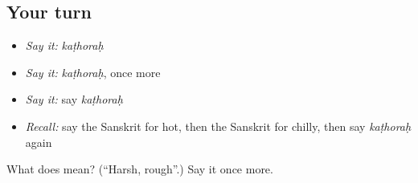 \subsection*{Your turn}
\begin{itemize}
\raggedright
  \item \emph{Say it:} \emph{kaṭhoraḥ}
  \item \emph{Say it:} \emph{kaṭhoraḥ}, once more
  \item \emph{Say it:} say \emph{kaṭhoraḥ}
  \item \emph{Recall:} say the Sanskrit for hot, then the Sanskrit for chilly, then say \emph{kaṭhoraḥ} again
\end{itemize}

\begin{tcolorbox}[breakable,colback=teal!4,colframe=teal!35!black,title={Before you move on}]
What does  mean? (\textquotedblleft{}Harsh, rough\textquotedblright{}.) Say it once more.
\end{tcolorbox}
